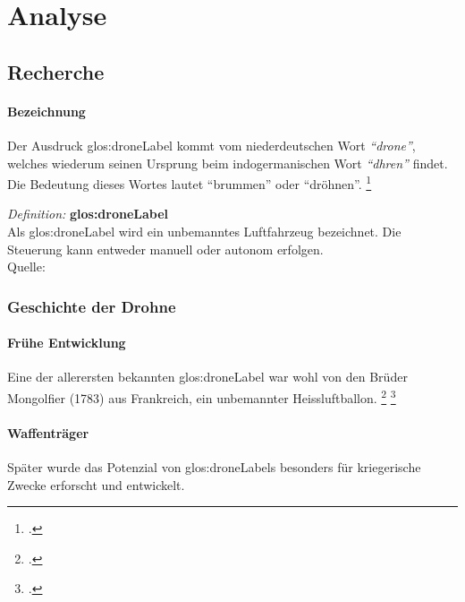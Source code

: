 \chapter{Analyse}

\section{Recherche}
\label{sec:recherche}

\subsubsection{Bezeichnung}
Der Ausdruck \gls{glos:droneLabel} kommt vom niederdeutschen Wort \textit{"`drone"'}, welches wiederum seinen Ursprung beim indogermanischen Wort \textit{"`dhren"'} findet. Die Bedeutung dieses Wortes lautet "`brummen"' oder "`dröhnen"'. \footcite{Geschichte_der_Drohne_-_Nachrichten_Print_-_DIE_WELT_-_Wissen_Print_DW_-_DIE_WELT_2015-03-21}

\begin{framed}
	\textit{Definition: }\textbf{\gls{glos:droneLabel}}\\
	Als \gls{glos:droneLabel} wird ein unbemanntes Luftfahrzeug bezeichnet. Die Steuerung kann entweder manuell oder autonom erfolgen.\\
	Quelle:
\end{framed}

\subsection{Geschichte der Drohne}

\subsubsection{Frühe Entwicklung}
Eine der allerersten bekannten \gls{glos:droneLabel} war wohl von den Brüder Mongolfier (1783) aus Frankreich, ein unbemannter Heissluftballon. \footcite{Kleine_Geschichte_der_Drohnen_-_Nachrichten_Print_-_WELT_KOMPAKT_-_Lifestyle_-_DIE_WELT_2015-03-21}
\footcite{Unbemannte_Luftfahrt__Wikipedia_2015-03-22}

\subsubsection{Waffenträger}
Später wurde das Potenzial von \glspl{glos:droneLabel} besonders für kriegerische Zwecke erforscht und entwickelt.

